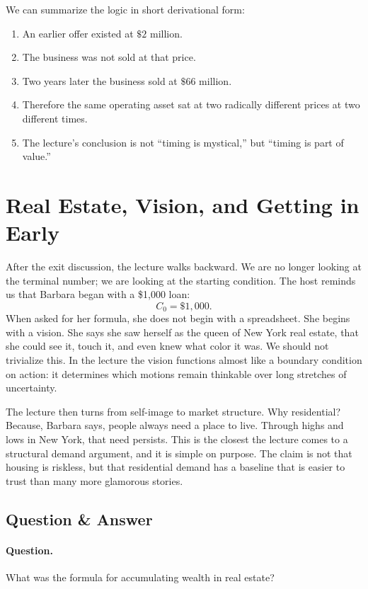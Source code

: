 We can summarize the logic in short derivational form:
\begin{enumerate}
\item An earlier offer existed at \(\$2\) million.
\item The business was not sold at that price.
\item Two years later the business sold at \(\$66\) million.
\item Therefore the same operating asset sat at two radically different prices at two different times.
\item The lecture's conclusion is not ``timing is mystical,'' but ``timing is part of value.''
\end{enumerate}

\section{Real Estate, Vision, and Getting in Early}

After the exit discussion, the lecture walks backward. We are no longer looking at the terminal number; we are looking at the starting condition. The host reminds us that Barbara began with a \$1{,}000 loan:
\begin{equation}
C_0=\$1{,}000.
\end{equation}
When asked for her formula, she does not begin with a spreadsheet. She begins with a vision. She says she saw herself as the queen of New York real estate, that she could see it, touch it, and even knew what color it was. We should not trivialize this. In the lecture the vision functions almost like a boundary condition on action: it determines which motions remain thinkable over long stretches of uncertainty.

The lecture then turns from self-image to market structure. Why residential? Because, Barbara says, people always need a place to live. Through highs and lows in New York, that need persists. This is the closest the lecture comes to a structural demand argument, and it is simple on purpose. The claim is not that housing is riskless, but that residential demand has a baseline that is easier to trust than many more glamorous stories.

\subsection{Question \& Answer}

\paragraph{Question.} What was the formula for accumulating wealth in real estate?

